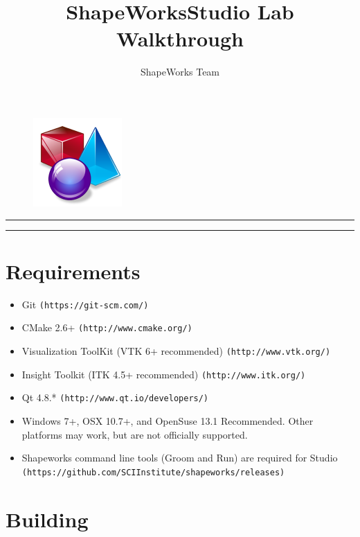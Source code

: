 \documentclass[letterpaper,12pt]{article}   %
\begin{document}
\title{ShapeWorksStudio Lab Walkthrough}
\begin{figure}
\centering
\includegraphics[scale=1]{figs/shapes-icon.png}
\end{figure}



\author{ShapeWorks Team}
\vspace{0.1in}
\vspace{0.2in}
\address{School of Computing, University of Utah, Salt Lake City, UT 84112, USA}

\vspace{0.5in}

\hrule
\tableofcontents
\vspace{0.02in}
\hrule

\section{Requirements}

\begin{itemize}
    \item Git \texttt{(https://git-scm.com/)}
    \item CMake 2.6+ \texttt{(http://www.cmake.org/)}
    \item Visualization ToolKit (VTK 6+ recommended) \texttt{(http://www.vtk.org/)}
    \item Insight Toolkit (ITK 4.5+ recommended) \texttt{(http://www.itk.org/)}
    \item Qt 4.8.* \texttt{(http://www.qt.io/developers/)}
    \item Windows 7+, OSX 10.7+, and OpenSuse 13.1 Recommended. Other platforms may work, but are not officially supported.
    \item Shapeworks command line tools (Groom and Run) are required for Studio \texttt{(https://github.com/SCIInstitute/shapeworks/releases)}
\end{itemize}

\section{Building}
\end{document}
